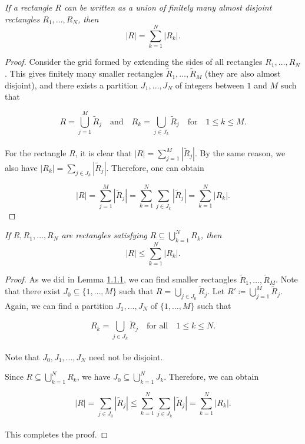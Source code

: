 \documentclass[12pt, a4paper, openany, twoside]{book}
\theoremstyle{definition}
\theoremstyle{remark}
\theoremstyle{plain}
\numberwithin{equation}{section}
\begin{document}
\begin{tcolorbox}[colback=yellow!10!white,colframe=red!75!black,title=Lemma 1.1.1]\label{Lemma 1.1.1}
    \emph{If a rectangle $R$ can be written as a union of finitely many almost disjoint rectangles $R_1,\dots, R_N$, then }
    \[|R|=\sum_{k=1}^{N}{|R_k|}.\]
\end{tcolorbox}
\begin{proof}
    Consider the grid formed by extending the sides of all rectangles $R_1,\dots, R_N$. This gives finitely many smaller rectangles $\tilde{R}_1,\dots,\tilde{R}_M$ (they are also almost disjoint), and there exists a partition $J_1,\dots, J_N$ of integers between $1$ and $M$ such that

    \[R=\bigcup_{j=1}^{M}{\tilde{R}_j}\quad\text{and}\quad R_k=\bigcup_{j\in J_k}{\tilde{R}_j}\quad\text{for}\quad 1\leq k\leq M.\]
    \\
    For the rectangle $R$, it is clear that $|R|=\sum_{j=1}^{M}{|\tilde{R}_j|}$. By the same reason, we also have $|R_k|=\sum_{j\in J_k}{|\tilde{R}_j|}$. Therefore, one can obtain

    \[|R|=\sum_{j=1}^{M}{|\tilde{R}_j|}=\sum_{k=1}^{N}{\sum_{j\in J_k}{|\tilde{R}_j|}}=\sum_{k=1}^{N}{|R_k|}.\]
\end{proof}
\vspace{5mm}
\begin{tcolorbox}[colback=yellow!10!white,colframe=red!75!black,title=Lemma 1.1.2]\label{Lemma 1.1.2}
    \emph{If $R, R_1,\dots,R_N$ are rectangles satisfying $R\subseteq\bigcup_{k=1}^{N}{R_k}$, then}
    \[|R|\leq \sum_{k=1}^{N}{|R_k|}.\]
\end{tcolorbox}
\begin{proof}
    As we did in Lemma \hyperref[Lemma 1.1.1]{1.1.1}, we can find smaller rectangles $\tilde{R}_1,\dots,\tilde{R}_M$. Note that there exist $J_0\subseteq\{1,\dots, M\}$ such that $R=\bigcup_{j\in J_0}{\tilde{R}_j}$. Let $R'\coloneqq\bigcup_{j=1}^{M}{\tilde{R}_j}$. Again, we can find a partition $J_1,\dots, J_N$ of $\{1,\dots, M\}$ such that 

    \[R_k=\bigcup_{j\in J_k}{\tilde{R}_j}\quad\text{for all}\quad 1\leq k\leq N.\]
    \\
    Note that $J_0, J_1,\dots, J_N$ need not be disjoint. 
    
    Since $R\subseteq\bigcup_{k=1}^{N}{R_k}$, we have $J_0\subseteq\bigcup_{k=1}^{N}{J_k}$. Therefore, we can obtain

    \[|R|=\sum_{j\in J_0}{|\tilde{R}_j|}\leq \sum_{k=1}^{N}{\sum_{j\in J_k}{|\tilde{R}_j|}}=\sum_{k=1}^{N}{|R_k|}.\]
    \\
    This completes the proof.
\end{proof}
\end{document}
